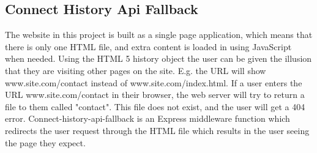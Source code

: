 \subsection{Connect History Api Fallback}
The website in this project is built as a single page application, which means that there is only one HTML file, and extra content is loaded in using JavaScript when needed. Using the HTML 5 history object\cite{HTML5HistoryObject:Info} the user can be given the illusion that they are visiting other pages on the site. E.g. the URL will show www.site.com/contact instead of www.site.com/index.html. If a user enters the URL www.site.com/contact in their browser, the web server will try to return a file to them called "contact". This file does not exist, and the user will get a 404 error. Connect-history-api-fallback\cite{CHAF:Info} is an Express middleware function which redirects the user request through the HTML file which results in the user seeing the page they expect.